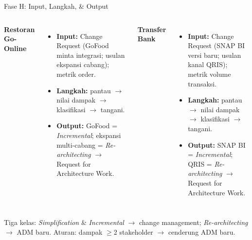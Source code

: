 \documentclass[aspectratio=169, table]{beamer}
\newcommand{\takeaway}[1]{%
  \vspace{4pt}
  {\footnotesize #1}
}
\begin{document}
\begin{frame}{Fase H: Input, Langkah, \& Output}
  \vspace{2pt}
  \small
  \begin{columns}[t]
    \textbf{\textcolor{praditagreen}{Restoran Go-Online}}
    \begin{itemize}\setlength{\itemsep}{2pt}
      \item \textbf{Input:} Change Request (GoFood minta integrasi; usulan ekspansi
            cabang); metrik order.
      \item \textbf{Langkah:} pantau $\rightarrow$ nilai dampak $\rightarrow$
            klasifikasi $\rightarrow$ tangani.
      \item \textbf{Output:} GoFood = \emph{Incremental}; ekspansi multi-cabang =
            \emph{Re-architecting} $\rightarrow$ Request for Architecture Work.
    \end{itemize}
    \textbf{\textcolor{blueColor}{Transfer Bank}}
    \begin{itemize}\setlength{\itemsep}{2pt}
      \item \textbf{Input:} Change Request (SNAP BI versi baru; usulan kanal QRIS);
            metrik volume transaksi.
      \item \textbf{Langkah:} pantau $\rightarrow$ nilai dampak $\rightarrow$
            klasifikasi $\rightarrow$ tangani.
      \item \textbf{Output:} SNAP BI = \emph{Incremental}; QRIS =
            \emph{Re-architecting} $\rightarrow$ Request for Architecture Work.
    \end{itemize}
  \end{columns}
  \takeaway{Tiga kelas: \emph{Simplification} \& \emph{Incremental} $\rightarrow$
  change management; \emph{Re-architecting} $\rightarrow$ ADM baru. Aturan: dampak
  $\geq$2 stakeholder $\rightarrow$ cenderung ADM baru.}
\end{frame}
\end{document}
